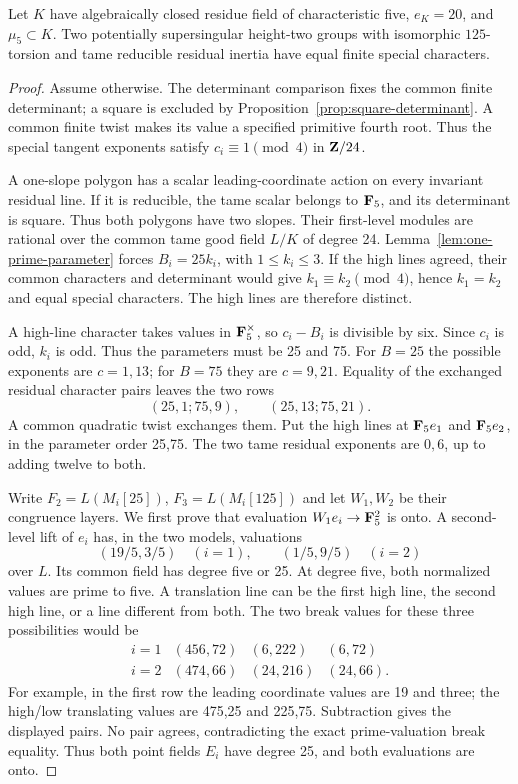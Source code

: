 \begin{theorem}\label{thm:tame-five-recovery}
Let $K$ have algebraically closed residue field of characteristic five, $e_K=20$, and $\mu_5\subset K$. Two potentially supersingular height-two groups with isomorphic $125$-torsion and tame reducible residual inertia have equal finite special characters.
\end{theorem}
\begin{proof}
Assume otherwise. The determinant comparison fixes the common finite determinant; a square is excluded by Proposition~\ref{prop:square-determinant}. A common finite twist makes its value a specified primitive fourth root. Thus the special tangent exponents satisfy $c_i\equiv1\pmod4$ in $\mathbf Z/24$.

A one-slope polygon has a scalar leading-coordinate action on every invariant residual line. If it is reducible, the tame scalar belongs to $\mathbf F_5$, and its determinant is square. Thus both polygons have two slopes. Their first-level modules are rational over the common tame good field $L/K$ of degree 24. Lemma~\ref{lem:one-prime-parameter} forces $B_i=25k_i$, with $1\le k_i\le3$. If the high lines agreed, their common characters and determinant would give $k_1\equiv k_2\pmod4$, hence $k_1=k_2$ and equal special characters. The high lines are therefore distinct.

A high-line character takes values in $\mathbf F_5^\times$, so $c_i-B_i$ is divisible by six. Since $c_i$ is odd, $k_i$ is odd. Thus the parameters must be 25 and 75. For $B=25$ the possible exponents are $c=1,13$; for $B=75$ they are $c=9,21$. Equality of the exchanged residual character pairs leaves the two rows
\[
 (25,1;75,9),\qquad(25,13;75,21).
\]
A common quadratic twist exchanges them. Put the high lines at $\mathbf F_5e_1$ and $\mathbf F_5e_2$, in the parameter order 25,75. The two tame residual exponents are $0,6$, up to adding twelve to both.

Write $F_2=L(M_i[25])$, $F_3=L(M_i[125])$ and let $W_1,W_2$ be their congruence layers. We first prove that evaluation $W_1e_i\to\mathbf F_5^2$ is onto. A second-level lift of $e_i$ has, in the two models, valuations
\[
          (19/5,3/5)\quad(i=1),\qquad(1/5,9/5)\quad(i=2)
\]
over $L$. Its common field has degree five or 25. At degree five, both normalized values are prime to five. A translation line can be the first high line, the second high line, or a line different from both. The two break values for these three possibilities would be
\[
 \begin{array}{c|ccc}
 i=1&(456,72)&(6,222)&(6,72)\\
 i=2&(474,66)&(24,216)&(24,66).
 \end{array}
\]
For example, in the first row the leading coordinate values are 19 and three; the high/low translating values are 475,25 and 225,75. Subtraction gives the displayed pairs. No pair agrees, contradicting the exact prime-valuation break equality. Thus both point fields $E_i$ have degree 25, and both evaluations are onto.


\end{proof}

